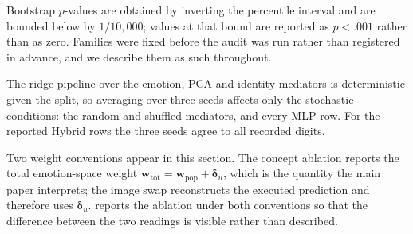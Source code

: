 %
%
%



Bootstrap $p$-values are obtained by inverting the percentile interval and are
bounded below by $1/10{,}000$; values at that bound are reported as $p<.001$
rather than as zero. Families were fixed before the audit was run rather than
registered in advance, and we describe them as such throughout.

The ridge pipeline over the emotion, PCA and identity mediators is
deterministic given the split, so averaging over three seeds affects only the
stochastic conditions: the random and shuffled mediators, and every MLP row.
For the reported Hybrid rows the three seeds agree to all recorded digits.



Two weight conventions appear in this section. The concept ablation reports the
total emotion-space weight $\mathbf w_{\mathrm{tot}}=\mathbf w_{\mathrm{pop}}
+\boldsymbol\delta_u$, which is the quantity the main paper interprets; the
image swap reconstructs the executed prediction and therefore uses
$\boldsymbol\delta_u$.  reports the ablation under both
conventions so that the difference between the two readings is visible rather
than described.

